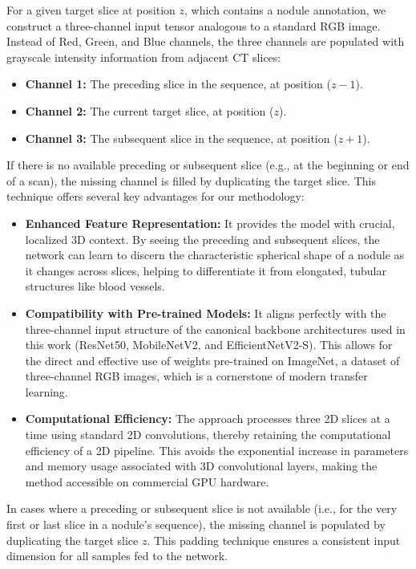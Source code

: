 For a given target slice at position $z$, which contains a nodule annotation, we construct a three-channel input tensor analogous to a standard RGB image. Instead of Red, Green, and Blue channels, the three channels are populated with grayscale intensity information from adjacent CT slices:

\begin{itemize}
    \item \textbf{Channel 1:} The preceding slice in the sequence, at position ($z-1$).
    \item \textbf{Channel 2:} The current target slice, at position ($z$).
    \item \textbf{Channel 3:} The subsequent slice in the sequence, at position ($z+1$).
\end{itemize}
If there is no available preceding or subsequent slice (e.g., at the beginning or end of a scan), the missing channel is filled by duplicating the target slice.
This technique offers several key advantages for our methodology:

\begin{itemize}
    \item \textbf{Enhanced Feature Representation:} It provides the model with crucial, localized 3D context. By seeing the preceding and subsequent slices, the network can learn to discern the characteristic spherical shape of a nodule as it changes across slices, helping to differentiate it from elongated, tubular structures like blood vessels.

    \item \textbf{Compatibility with Pre-trained Models:} It aligns perfectly with the three-channel input structure of the canonical backbone architectures used in this work (ResNet50, MobileNetV2, and EfficientNetV2-S). This allows for the direct and effective use of weights pre-trained on ImageNet, a dataset of three-channel RGB images, which is a cornerstone of modern transfer learning.

    \item \textbf{Computational Efficiency:} The approach processes three 2D slices at a time using standard 2D convolutions, thereby retaining the computational efficiency of a 2D pipeline. This avoids the exponential increase in parameters and memory usage associated with 3D convolutional layers, making the method accessible on commercial GPU hardware.
\end{itemize}

In cases where a preceding or subsequent slice is not available (i.e., for the very first or last slice in a nodule's sequence), the missing channel is populated by duplicating the target slice $z$. This padding technique ensures a consistent input dimension for all samples fed to the network.

